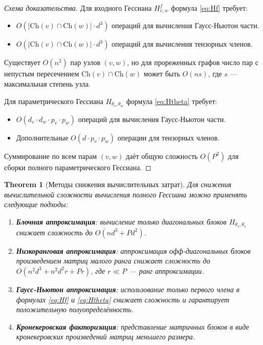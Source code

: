 \documentclass[11pt]{article}
\newtheorem{theorem}{Theorem}
\newcommand{\Ch}{\mathrm{Ch}} %
\begin{document}
\begin{proof}[Схема доказательства]
  Для входного Гессиана $H^f_{v,w}$ формула \eqref{eq:Hf} требует:
  \begin{itemize}
    \item $O(|\Ch(v) \cap \Ch(w)| \cdot d^3)$ операций для вычисления Гаусс-Ньютон части.
    \item $O(|\Ch(v) \cap \Ch(w)| \cdot d^3)$ операций для вычисления тензорных членов.
  \end{itemize}

  Существует $O(n^2)$ пар узлов $(v,w)$, но для прореженных графов число пар с непустым пересечением $\Ch(v)
  \cap \Ch(w)$ может быть $O(n s)$, где $s$ — максимальная степень узла.

  Для параметрического Гессиана $H_{\theta_v,\theta_w}$ формула \eqref{eq:Htheta} требует:
  \begin{itemize}
    \item $O(d_v \cdot d_w \cdot p_v \cdot p_w)$ операций для вычисления Гаусс-Ньютон части.
    \item Дополнительные $O(d \cdot p_v \cdot p_w)$ операции для тензорных членов.
  \end{itemize}

  Суммирование по всем парам $(v,w)$ даёт общую сложность $O(P^2)$ для сборки полного параметрического Гессиана.
\end{proof}

\begin{theorem}[Методы снижения вычислительных затрат]
  Для снижения вычислительной сложности вычисления полного Гессиана можно применять следующие подходы:
  \begin{enumerate}
    \item \textbf{Блочная аппроксимация}: вычисление только диагональных блоков $H_{\theta_v, \theta_v}$
      снижает сложность до $O(n d^3 + P d^2)$.
    \item \textbf{Низкоранговая аппроксимация}: аппроксимация офф-диагональных блоков произведением матриц
      малого ранга снижает сложность до $O(n^2 d^3 + n^2 d^2 r + P r)$, где $r \ll P$ — ранг аппроксимации.
    \item \textbf{Гаусс-Ньютон аппроксимация}: использование только первого члена в формулах \eqref{eq:Hf} и
      \eqref{eq:Htheta} снижает сложность и гарантирует положительную полуопределённость.
    \item \textbf{Кронекеровская факторизация}: представление матричных блоков в виде кронекеровских
      произведений матриц меньшего размера.
  \end{enumerate}
\end{theorem}
\end{document}
